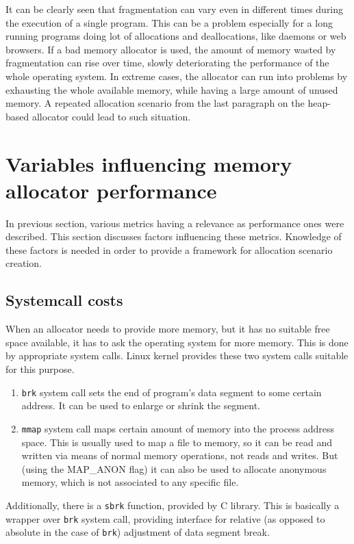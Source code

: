 It can be clearly seen that fragmentation can vary even in different times during the execution of a single program. This can be a problem especially for a long running programs doing lot of allocations and deallocations, like daemons or web browsers. If a bad memory allocator is used, the amount of memory wasted by fragmentation can rise over time, slowly deteriorating the performance of the whole operating system. In extreme cases, the allocator can run into problems by exhausting the whole available memory, while having a large amount of unused memory.\cite{DSAsurvey} A repeated allocation scenario from the last paragraph on the heap-based allocator could lead to such situation.

\section{Variables influencing memory allocator performance}
\label{variables}
In previous section, various metrics having a relevance as performance ones were described. This section discusses factors influencing these metrics. Knowledge of these factors is needed in order to provide a framework for allocation scenario creation.
\subsection{Systemcall costs}

When an allocator needs to provide more memory, but it has no suitable free space available, it has to ask the operating system for more memory. This is done by appropriate system calls. Linux kernel provides these two system calls suitable for this purpose.

\begin{enumerate}
\item {\tt brk} system call sets the end of program's data segment to some certain address. It can be used to enlarge or shrink the segment.\cite{posix, sbrk-manpage}
\item {\tt mmap} system call maps certain amount of memory into the process address space. This is usually used to map a file to memory, so it can be read and written via means of normal memory operations, not reads and writes. But (using the MAP\_ANON flag) it can also be used to allocate anonymous memory, which is not associated to any specific file.\cite{posix, mmap-manpage}
\end{enumerate}
Additionally, there is a {\tt sbrk} function, provided by C library. This is basically a wrapper over {\tt brk} system call, providing interface for relative (as opposed to absolute in the case of {\tt brk}) adjustment of data segment break.\cite{sbrk-manpage}

